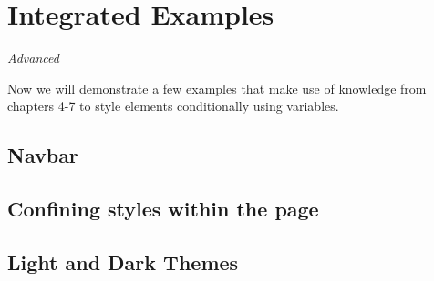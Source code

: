 \chapter{Integrated Examples}

\textit{Advanced}
\vspace{6mm}

Now we will demonstrate a few examples that make use of knowledge from chapters 4-7 to style elements conditionally using variables.

\section{Navbar}

\section{Confining styles within the page}
\label{sec:confinestyles}

\section{Light and Dark Themes}
